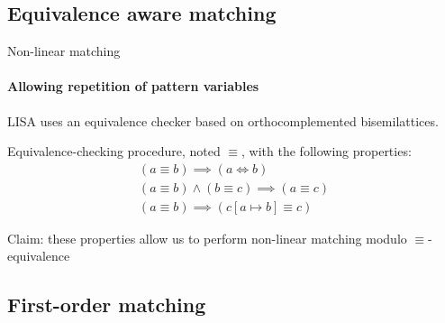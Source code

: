 
\subsection{Equivalence aware matching}

\begin{frame}{Non-linear matching}
\framesubtitle{Allowing repetition of pattern variables}

LISA uses an equivalence checker based on orthocomplemented bisemilattices.

Equivalence-checking procedure, noted $\equiv$, with the following properties:
\begin{gather*}
(a \equiv b) \implies (a \Leftrightarrow b) \tag{Equivalence} \\[0.25cm]
(a \equiv b) \land (b \equiv c) \implies (a \equiv c) \tag{Transitivity} \\[0.25cm]
(a \equiv b) \implies (c[a \mapsto b] \equiv c) \tag{Substitution}
\end{gather*}

\vspace{0.5cm}

Claim: these properties allow us to perform non-linear matching modulo $\equiv$-equivalence


\end{frame}

\subsection{First-order matching}

